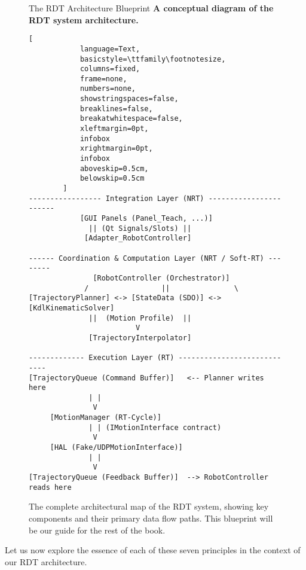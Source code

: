 \begin{figure}[h!] 
    \centering
    \begin{infobox}{The RDT Architecture Blueprint} %
        \textbf{A conceptual diagram of the RDT system architecture.} %

        \begin{lstlisting}[
            language=Text,              
            basicstyle=\ttfamily\footnotesize, 
            columns=fixed,              
            frame=none,                 
            numbers=none,               
            showstringspaces=false,   
            breaklines=false,           
            breakatwhitespace=false,    
            xleftmargin=0pt,           
            infobox
            xrightmargin=0pt,           
            infobox
            aboveskip=0.5cm,            
            belowskip=0.5cm             
        ]
----------------- Integration Layer (NRT) -----------------------
            [GUI Panels (Panel_Teach, ...)]    
              || (Qt Signals/Slots) ||
             [Adapter_RobotController]

------ Coordination & Computation Layer (NRT / Soft-RT) --------
               [RobotController (Orchestrator)]
             /                 ||               \
[TrajectoryPlanner] <-> [StateData (SDO)] <-> [KdlKinematicSolver]
              ||  (Motion Profile)  ||
                         V
              [TrajectoryInterpolator]

------------- Execution Layer (RT) ----------------------------
[TrajectoryQueue (Command Buffer)]   <-- Planner writes here
              | |
               V
     [MotionManager (RT-Cycle)]
              | | (IMotionInterface contract)
               V
     [HAL (Fake/UDPMotionInterface)]
              | |
               V
[TrajectoryQueue (Feedback Buffer)]  --> RobotController reads here
        \end{lstlisting}
    \end{infobox}
    \caption{The complete architectural map of the RDT system, showing key components and their primary data flow paths. This blueprint will be our guide for the rest of the book.}
    \label{fig:rdt_blueprint}
\end{figure}


Let us now explore the essence of each of these seven principles in the context of our RDT architecture.


